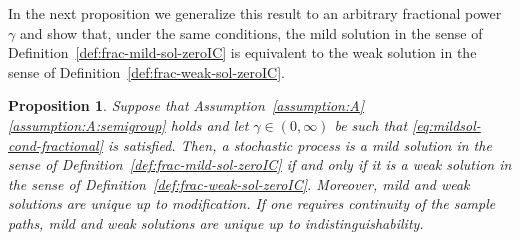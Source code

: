 \documentclass[reqno]{amsart}
\numberwithin{equation}{section}
\newtheorem{proposition}[lemma]{Proposition}
\theoremstyle{remark}
\theoremstyle{definition}
\begin{document}
In the next proposition 
we generalize this result 
to an arbitrary fractional power~$\gamma$ 
and show that, 
under the same conditions, 
the mild solution 
in the sense of Definition~\textup{\ref{def:frac-mild-sol-zeroIC}}  
is equivalent to the weak solution 
in the sense of Definition~\textup{\ref{def:frac-weak-sol-zeroIC}}. 

\begin{proposition}\label{prop:fractional-mild-equiv-weak-zeroIC}
	Suppose that Assumption~\textup{\ref{assumption:A}\ref{assumption:A:semigroup}} 
	holds and let $\gamma \in (0,\infty)$ be such that
	\eqref{eq:mildsol-cond-fractional} is satisfied. 
	Then, a stochastic process 
	is a mild solution 
	in the sense of Definition~\textup{\ref{def:frac-mild-sol-zeroIC}} 
	if and only if 
	it is a weak solution 
	in the sense of Definition~\textup{\ref{def:frac-weak-sol-zeroIC}}. 
	Moreover, mild and weak solutions are unique 
	up to modification. 
	If one requires continuity  
	of the sample paths, 
	mild and weak solutions 
	are unique up to indistinguishability.  
\end{proposition}
\end{document}
